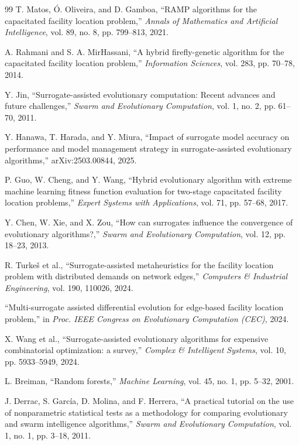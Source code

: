 \documentclass[conference]{IEEEtran}
\begin{document}
\begin{thebibliography}{99}
 T. Matos, Ó. Oliveira, and D. Gamboa, ``RAMP algorithms for the capacitated facility location problem,'' \emph{Annals of Mathematics and Artificial Intelligence}, vol. 89, no. 8, pp. 799--813, 2021.

 A. Rahmani and S. A. MirHassani, ``A hybrid firefly-genetic algorithm for the capacitated facility location problem,'' \emph{Information Sciences}, vol. 283, pp. 70--78, 2014.

 Y. Jin, ``Surrogate-assisted evolutionary computation: Recent advances and future challenges,'' \emph{Swarm and Evolutionary Computation}, vol. 1, no. 2, pp. 61--70, 2011.

 Y. Hanawa, T. Harada, and Y. Miura, ``Impact of surrogate model accuracy on performance and model management strategy in surrogate-assisted evolutionary algorithms,'' arXiv:2503.00844, 2025.

 P. Guo, W. Cheng, and Y. Wang, ``Hybrid evolutionary algorithm with extreme machine learning fitness function evaluation for two-stage capacitated facility location problems,'' \emph{Expert Systems with Applications}, vol. 71, pp. 57--68, 2017.

 Y. Chen, W. Xie, and X. Zou, ``How can surrogates influence the convergence of evolutionary algorithms?,'' \emph{Swarm and Evolutionary Computation}, vol. 12, pp. 18--23, 2013.

 R. Turkeš et al., ``Surrogate-assisted metaheuristics for the facility location problem with distributed demands on network edges,'' \emph{Computers \& Industrial Engineering}, vol. 190, 110026, 2024.

 ``Multi-surrogate assisted differential evolution for edge-based facility location problem,'' in \emph{Proc. IEEE Congress on Evolutionary Computation (CEC)}, 2024.

 X. Wang et al., ``Surrogate-assisted evolutionary algorithms for expensive combinatorial optimization: a survey,'' \emph{Complex \& Intelligent Systems}, vol. 10, pp. 5933--5949, 2024.

 L. Breiman, ``Random forests,'' \emph{Machine Learning}, vol. 45, no. 1, pp. 5--32, 2001.

 J. Derrac, S. García, D. Molina, and F. Herrera, ``A practical tutorial on the use of nonparametric statistical tests as a methodology for comparing evolutionary and swarm intelligence algorithms,'' \emph{Swarm and Evolutionary Computation}, vol. 1, no. 1, pp. 3--18, 2011.


\end{thebibliography}
\end{document}
